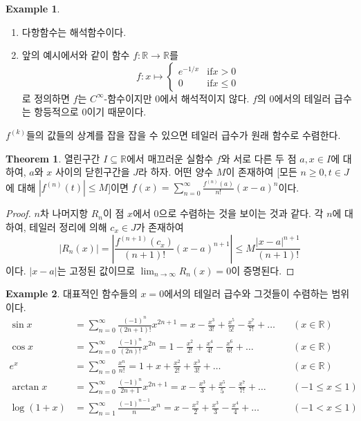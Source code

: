 \documentclass[11pt]{book}
\numberwithin{equation}{chapter}
\def\RR{\mathbb{R}}
\newcommand{\abs}[1]{\left\vert#1\right\vert}
\def\textif{\text{if}}
\theoremstyle{definition}
\newtheorem{thm}{Theorem}[section]
\newtheorem*{ex}{Example}
\newenvironment{enum}
	{\begin{enumerate}[label=(\alph*), leftmargin=2\parindent]}
	{\end{enumerate}}
\begin{document}
\begin{ex}
    \quad

    \begin{enum}
        \item 다항함수는 해석함수이다.
        \item 앞의 예시에서와 같이 함수 \(f : \RR \to \RR\)를
        \[
            f : x \mapsto
            \begin{cases}
                e^{-1/x} &\textif x > 0\\
                0 &\textif x \le 0
            \end{cases}
        \]
        로 정의하면 \(f\)는 \(C^\infty\)-함수이지만 0에서 해석적이지 않다. \(f\)의 0에서의 테일러 급수는 항등적으로 0이기 때문이다.
    \end{enum}
\end{ex}

\(f^{(k)}\)들의 값들의 상계를 잡을 잡을 수 있으면 테일러 급수가 원래 함수로 수렴한다.

\begin{thm}
    열린구간 \(I \subseteq \RR\)에서 매끄러운 실함수 \(f\)와 서로 다른 두 점 \(a, x \in I\)에 대하여, \(a\)와 \(x\) 사이의 닫힌구간을 \(J\)라 하자. 어떤 양수 \(M\)이 존재하여 [모든 \(n \ge 0, t \in J\)에 대해 \(\abs{f^{(n)}(t)} \le M\)]이면 \(f(x) = \sum_{n=0}^\infty \frac{f^{(n)}(a)}{n!} (x-a)^n\)이다.
\end{thm}
\begin{proof}
    \(n\)차 나머지항 \(R_n\)이 점 \(x\)에서 0으로 수렴하는 것을 보이는 것과 같다. 각 \(n\)에 대하여, 테일러 정리에 의해 \(c_x \in J\)가 존재하여
    \[
    \abs{R_n(x)} = \abs{\frac{f^{(n+1)}(c_x)}{(n+1)!}(x-a)^{n+1}} \le M \frac{\abs{x-a}^{n+1}}{(n+1)!}
    \]
    이다. \(\abs{x-a}\)는 고정된 값이므로 \(\lim_{n \to \infty} R_n(x) = 0\)이 증명된다.
\end{proof}

\begin{ex}
	대표적인 함수들의 \(x=0\)에서의 테일러 급수와 그것들이 수렴하는 범위이다.
	\begin{align*}
		\sin x &= \sum_{n=0}^\infty \frac{(-1)^n}{(2n+1)!} x^{2n+1} = x - \frac{x^3}{3!} + \frac{x^5}{5!} - \frac{x^7}{7!} + \ldots \quad &(x \in \RR)\\
		\cos x &= \sum_{n=0}^\infty \frac{(-1)^n}{(2n)!} x^{2n} = 1 - \frac{x^2}{2!} + \frac{x^4}{4!} - \frac{x^6}{6!} + \ldots \quad &(x \in \RR)\\
		e^x &= \sum_{n=0}^\infty \frac{x^n}{n!} = 1 + x + \frac{x^2}{2!} + \frac{x^3}{3!} + \ldots \quad &(x \in \RR)\\
		\arctan x &= \sum_{n=0}^\infty \frac{(-1)^n}{2n+1} x^{2n+1} = x - \frac{x^3}{3} + \frac{x^5}{5} - \frac{x^7}{7!} + \ldots \quad &(-1 \le x \le 1)\\
		\log (1+x) &= \sum_{n=1}^\infty \frac{(-1)^{n-1}}{n} x^n = x - \frac{x^2}{2} + \frac{x^3}{3} - \frac{x^4}{4} + \ldots \quad &(-1 < x \le 1)
	\end{align*}
\end{ex}
\end{document}
